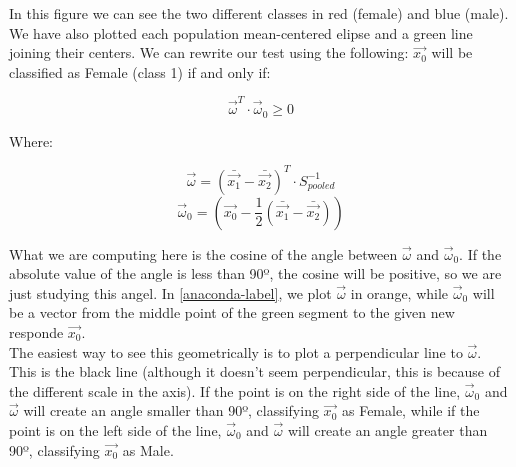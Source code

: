\documentclass[11pt,a4paper]{article}
\begin{document}
	In this figure we can see the two different classes in red (female) and blue (male). We have also plotted each population mean-centered elipse and a green line joining their centers. We can rewrite our test using the following: $\vec{x_0}$ will be classified as Female (class 1) if and only if:
	
	$$ \vec{\omega}^T \cdot \vec{\omega}_0 \ge 0 $$
	
	Where:
	
	$$ \vec{\omega} = (\bar{\vec{x_1}} - \bar{\vec{x_2}})^T \cdot S_{pooled}^{-1} $$
	$$ \vec{\omega}_0 = (\vec{x_0} - \frac{1}{2}(\bar{\vec{x_1}} - \bar{\vec{x_2}})) $$
	
	What we are computing here is the cosine of the angle between $\vec{\omega}$ and $\vec{\omega}_0$. If the absolute value of the angle is less than 90º, the cosine will be positive, so we are just studying this angel. In \ref{anaconda-label}, we plot $\vec{\omega}$ in orange, while $\vec{\omega}_0$ will be a vector from the middle point of the green segment to the given new responde $\vec{x_0}$. \\
	
	The easiest way to see this geometrically is to plot a perpendicular line to $\vec{\omega}$. This is the black line (although it doesn't seem perpendicular, this is because of the different scale in the axis). If the point is on the right side of the line, $\vec{\omega}_0$ and $\vec{\omega}$ will create an angle smaller than 90º, classifying $\vec{x_0}$ as Female, while if the point is on the left side of the line, $\vec{\omega}_0$ and $\vec{\omega}$ will create an angle greater than 90º, classifying $\vec{x_0}$ as Male.
	
\end{document}
